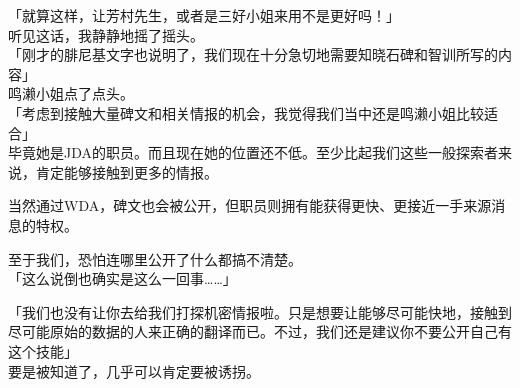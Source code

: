「就算这样，让芳村先生，或者是三好小姐来用不是更好吗！」\\

听见这话，我静静地摇了摇头。\\

「刚才的腓尼基文字也说明了，我们现在十分急切地需要知晓石碑和智训所写的内容」\\

鸣濑小姐点了点头。\\

「考虑到接触大量碑文和相关情报的机会，我觉得我们当中还是鸣濑小姐比较适合」\\

毕竟她是JDA的职员。而且现在她的位置还不低。至少比起我们这些一般探索者来说，肯定能够接触到更多的情报。

当然通过WDA，碑文也会被公开，但职员则拥有能获得更快、更接近一手来源消息的特权。

至于我们，恐怕连哪里公开了什么都搞不清楚。\\

「这么说倒也确实是这么一回事……」

「我们也没有让你去给我们打探机密情报啦。只是想要让能够尽可能快地，接触到尽可能原始的数据的人来正确的翻译而已。不过，我们还是建议你不要公开自己有这个技能」\\

要是被知道了，几乎可以肯定要被诱拐。

